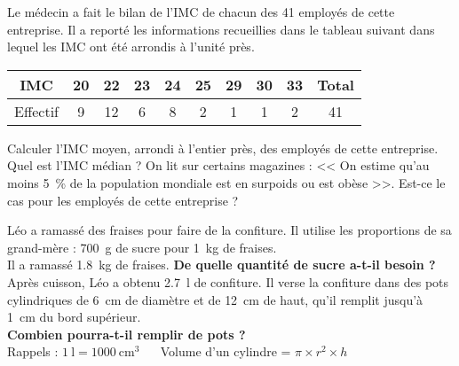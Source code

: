 \documentclass[../Cours.tex]{subfiles}
\begin{document}
\begin{questions}
\begin{center}
    \hfill{} \hfill {} \hfill {} \hfill {}\hfill
\end{center}

\question Le médecin a fait le bilan de l’IMC de chacun des 41 employés de cette entreprise. Il a reporté les informations recueillies dans le tableau suivant dans lequel les IMC ont été arrondis à l’unité près.

\begin{center}
    \begin{tabularx}{0.8\linewidth}{|c|*{8}{C|}c|}\hline
        IMC & 20 & 22 & 23 & 24 & 25 & 29 & 30 & 33 & Total \\\hline
        Effectif & 9 & 12 & 6 & 8 & 2 & 1 & 1 & 2 & 41 \\\hline
    \end{tabularx}
\end{center}

\subquestion Calculer l’IMC moyen, arrondi à l'entier près, des employés de cette entreprise.
\subquestion Quel est l’IMC médian ? 
\subquestion On lit sur certains magazines : << On estime qu’au moins \qty{5}{\%} de la population mondiale est en surpoids ou est obèse >>. Est-ce le cas pour les employés de cette entreprise ?

Léo a ramassé des fraises pour faire de la confiture.
\question Il utilise les proportions de sa grand-mère : \qty{700}{\gram} de sucre pour \qty{1}{\kilo\gram} de fraises.\\
Il a ramassé \qty{1.8}{\kilo\gram} de fraises. \textbf{De quelle quantité de sucre a-t-il besoin ?}
\question Après cuisson, Léo a obtenu \qty{2.7}{\litre} de confiture.
Il verse la confiture dans des pots cylindriques de \qty{6}{\centi\metre} de diamètre et de \qty{12}{\centi\metre} de haut, qu’il remplit jusqu’à \qty{1}{\centi\metre} du bord supérieur.\\
\textbf{Combien pourra-t-il remplir de pots ?}\\[1ex]
Rappels : $\qty{1}{\litre}=\qty{1000}{\centi\metre\cubed}$ ~~ Volume d’un cylindre = $\pi \times r^2 \times h$

\end{questions}
\end{document}
